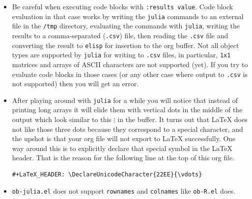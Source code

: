 \documentclass[11pt]{article}
\begin{document}
\begin{itemize}
\item Be careful when executing code blocks with \texttt{:results value}.  Code
block evaluation in that case works by writing the \texttt{julia} commands
to an external file in the \texttt{/tmp} directory, evaluating the commands
with \texttt{julia}, writing the results to a comma-separated (\texttt{.csv})
file, then reading the \texttt{.csv} file and converting the result to
\texttt{elisp} for insertion to the org buffer.  Not all object types are
supported by \texttt{julia} for writing to \texttt{.csv} files, in particular,
\texttt{1x1} matrices and arrays of ASCII characters are not supported
(yet).  If you try to evaluate code blocks in those cases (or any
other case where output to \texttt{.csv} is not supported) then you will
get an error.

\item After playing around with \texttt{julia} for a while you will notice that
instead of printing long arrays it will elide them with vertical
dots in the middle of the output which look similar to this \(
  \vdots \) in the buffer.  It turns out that \LaTeX{} does not like
those three dots because they correspond to a special character, and
the upshot is that your org file will not export to \LaTeX{}
successfully.  One way around this is to explicitly declare that
special symbol in the \LaTeX{} header. That is the reason for the
following line at the top of this org file.

\begin{verbatim}
#+LaTeX_HEADER: \DeclareUnicodeCharacter{22EE}{\vdots}
\end{verbatim}

\item \texttt{ob-julia.el} does not support \texttt{rownames} and \texttt{colnames} like
  \texttt{ob-R.el} does.
\end{itemize}
\end{document}
